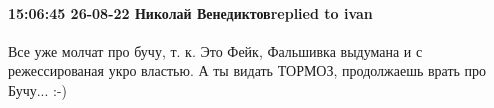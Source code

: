 
 
 
 
 

\paragraph{15:06:45 26-08-22 Николай Венедиктовreplied to ivan}

Все уже молчат про бучу, т. к. Это Фейк, Фальшивка выдумана и с режессированая
укро властью. А ты видать ТОРМОЗ, продолжаешь врать про Бучу... :-)


